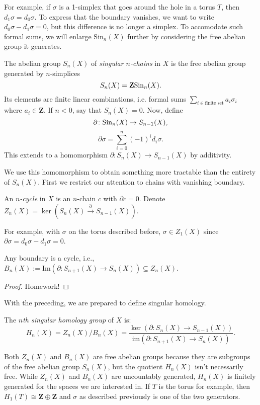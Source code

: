 For example, if $\sigma$ is a 1-simplex that goes around the hole in a torus $T$, then $d_1\sigma = d_0\sigma$. To express that the boundary vanishes, we want to write $d_0\sigma - d_1\sigma=0$, but this difference is no longer a simplex. To accomodate such formal sums, we will enlarge $\mathrm{Sin}_n(X)$ further by considering the free abelian group it generates.
\begin{definition}
The abelian group $S_n(X)$ of \emph{singular $n$-chains} in $X$ is the free abelian group generated by $n$-simplices
$$S_n(X) = \mathbf{Z}\mathrm{Sin}_n(X).$$
    Its elements are finite linear combinations, i.e. formal sums $\sum_{i\in\text{finite set}}a_i\sigma_i$ where $a_i\in\mathbf{Z}$. If $n<0$, say that $S_n(X)=0$. Now, define
$$\partial\colon \mathrm{Sin}_n(X)\to S_{n-1}(X),$$
$$\partial\sigma = \sum_{i=0}^n(-1)^i d_i\sigma.$$
This extends to a homomorphism $\partial \colon S_n(X) \to S_{n-1}(X)$ by additivity.
\end{definition}
We use this homomorphism to obtain something more tractable than the entirety of $S_n(X)$. First we restrict our attention to chains with vanishing boundary.
\begin{definition}
An \emph{$n$-cycle} in $X$ is an $n$-chain $c$ with $\partial c = 0$. Denote $Z_n(X) = \ker(S_n(X)\xrightarrow{\partial}S_{n-1}(X))$.
\end{definition}
For example, with $\sigma$ on the torus described before, $\sigma\in Z_1(X)$ since $\partial \sigma = d_0\sigma - d_1\sigma = 0$.
\begin{theorem}
Any boundary is a cycle, i.e., $B_n(X) := \mathrm{Im}(\partial:S_{n+1}(X)\to S_n(X))\subseteq Z_n(X)$.
\end{theorem}
\begin{proof}
    Homework!
\end{proof}
With the preceding, we are prepared to define singular homology.
\begin{definition}
The \emph{$n$th singular homology group} of $X$ is:
    $$ H_n(X) = Z_n(X)/B_n(X) = \frac{\ker(\partial:S_n(X)\to S_{n-1}(X))}{\mathrm{im}(\partial:S_{n+1}(X)\to S_n(X))}.$$
\end{definition}
Both $Z_n(X)$ and $B_n(X)$ are free abelian groups because they are subgroups of the free abelian group $S_n(X)$, but the quotient $H_n(X)$ isn't necessarily free. While $Z_n(X)$ and $B_n(X)$ are uncountably generated, $H_n(X)$ is finitely generated for the spaces we are interested in. If $T$ is the torus for example, then $H_1(T) \cong \mathbf{Z} \oplus \mathbf{Z}$ and $\sigma$ as described previously is one of the two generators.